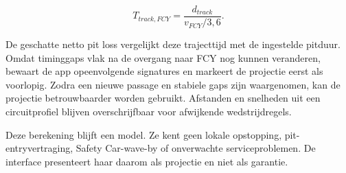 \[
  T_{track,FCY} = \frac{d_{track}}{v_{FCY}/3{,}6}.
\]

De geschatte netto pit loss vergelijkt deze trajecttijd met de ingestelde pitduur. Omdat timinggaps vlak na de overgang naar FCY nog kunnen veranderen, bewaart de app opeenvolgende signatures en markeert de projectie eerst als voorlopig. Zodra een nieuwe passage en stabiele gaps zijn waargenomen, kan de projectie betrouwbaarder worden gebruikt. Afstanden en snelheden uit een circuitprofiel blijven overschrijfbaar voor afwijkende wedstrijdregels.

Deze berekening blijft een model. Ze kent geen lokale opstopping, pit-entryvertraging, Safety Car-wave-by of onverwachte serviceproblemen. De interface presenteert haar daarom als projectie en niet als garantie.

